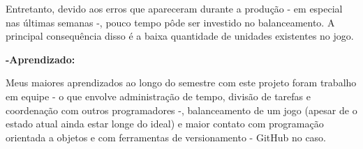 \documentclass{article}
\begin{document}
\qquad Entretanto, devido aos erros que apareceram durante a produção - em especial nas últimas semanas -, pouco tempo pôde ser investido no balanceamento. A principal consequência disso é a baixa quantidade de unidades existentes no jogo.

\bigskip
\quad\textbf{-Aprendizado:}

\qquad Meus maiores aprendizados ao longo do semestre com este projeto foram trabalho em equipe - o que envolve administração de tempo, divisão de tarefas e coordenação com outros programadores -, balanceamento de um jogo (apesar de o estado atual ainda estar longe do ideal) e maior contato com programação orientada a objetos e com ferramentas de versionamento - GitHub no caso.
\end{document}
